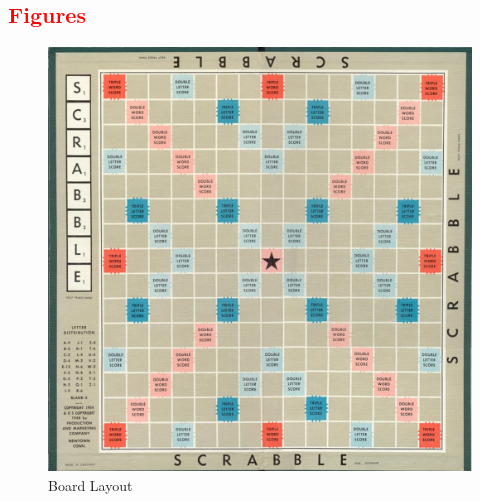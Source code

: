 \documentclass[12pt, titlepage]{article}
\begin{document}
\textcolor{red}{\subsection{\textcolor{red}{Figures}}}
\begin{figure}[h!]
    \centering
    \includegraphics[width=\textwidth,height=\textheight, keepaspectratio]{SRS/Scrabble_board.jpg}
    \caption{Board Layout}
    \label{fig:my_label}
\end{figure}
\end{document}
